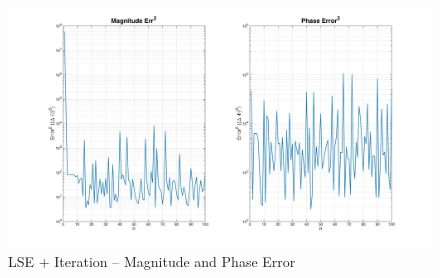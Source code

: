 \begin{figure}[ht!]
\includegraphics[keepaspectratio=true,width=6in]{./figures/regression/levyIter_Err1.jpg}
\centering
\caption{LSE + Iteration -- Magnitude and Phase Error}
\label{fig:levyIter_Err1}
\end{figure}

